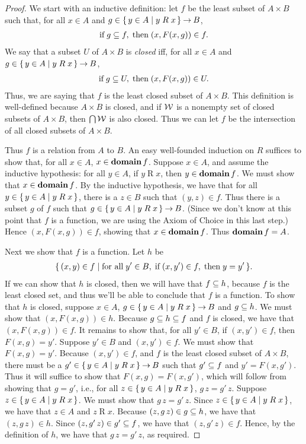 \begin{proof}
We start with an inductive definition:
let $f$ be the least subset of $A\times B$ such that, for
all $x\in A$ and $g\in\{ \, y\in A \mid y\mathrel{R}x \, \}\mathbin{\to} B$,
\begin{gather*}
\allowbreak\mbox{if}\allowbreak\; g\subseteq f, \;\allowbreak\mbox{then}\allowbreak\; (x, F(x, g))\in f .
\end{gather*}
We say that a subset $U$ of $A\times B$ is \emph{closed} iff, for
all $x\in A$ and $g\in\{ \, y\in A \mid y\mathrel{R}x \, \}\mathbin{\to} B$,
\begin{gather*}
\allowbreak\mbox{if}\allowbreak\; g\subseteq U, \;\allowbreak\mbox{then}\allowbreak\; (x, F(x, g))\in U .
\end{gather*}
Thus, we are saying that $f$ is the least closed subset of
$A\times B$.
This definition is well-defined because $A\times B$ is closed,
and if $\cal W$ is a nonempty set of closed subsets
of $A\times B$, then $\bigcap\cal W$ is also closed.
Thus we can let $f$ be the intersection of
all closed subsets of $A\times B$.

Thus $f$ is a relation from $A$ to $B$.  An easy well-founded
induction on $R$ suffices to show that, for all $x\in A$,
$x\in\mathbf{domain}\,f$.  Suppose $x\in A$, and assume the inductive
hypothesis: for all $y\in A$, if $y\mathrel{R}x$, then $y\in\mathbf{domain}\,f$.
We must show that $x\in\mathbf{domain}\,f$.  By the inductive hypothesis,
we have that for all $y\in\{ \, y\in A \mid y\mathrel{R}x \, \}$,
there is a $z\in B$ such that $(y,z)\in f$.  Thus there
is a subset $g$ of $f$ such that $g\in\{ \, y\in A \mid y\mathrel{R}x \, \}\mathbin{\to} B$.
(Since we don't know at this point that $f$ is a function, we
are using the Axiom of Choice in this last step.)
Hence $(x,F(x,g))\in f$, showing that $x\in\mathbf{domain}\,f$.
Thus $\mathbf{domain}\,f=A$.

Next we show that $f$ is a function.  Let $h$ be
\begin{gather*}
\{ \, (x,y)\in f \mid \allowbreak\mbox{for all}\allowbreak\;y'\in B,\;\allowbreak\mbox{if}\allowbreak\;(x,y')\in f,
\;\allowbreak\mbox{then}\allowbreak\; y = y' \, \} .
\end{gather*}
If we can show that $h$ is closed, then we will have that $f\subseteq h$,
because $f$ is the least closed set, and thus we'll be able to
conclude that $f$ is a function.  To show that $h$ is closed, suppose
$x\in A$, $g\in\{ \, y\in A \mid y\mathrel{R}x \, \}\mathbin{\to} B$ and $g\subseteq h$.  We
must show that $(x, F(x, g))\in h$. Because $g\subseteq h\subseteq f$ and $f$ is
closed, we have that $(x, F(x, g))\in f$.  It remains to show that,
for all $y'\in B$, if $(x,y')\in f$, then $F(x, g) = y'$.  Suppose
$y'\in B$ and $(x,y')\in f$.  We must show that $F(x, g) = y'$.
Because $(x,y')\in f$, and $f$ is the least closed subset of
$A\times B$, there must be a
$g'\in \{ \, y\in A \mid y\mathrel{R}x \, \}\mathbin{\to} B$ such that $g'\subseteq f$ and
$y'=F(x, g')$.  Thus it will suffice to show that $F(x,g) = F(x, g')$,
which will follow from showing that $g=g'$, i.e., for all
$z\in\{ \, y\in A \mid y\mathrel{R}x \, \}$, $g\,z=g'\,z$.  Suppose
$z\in\{ \, y\in A \mid y\mathrel{R}x \, \}$.  We must show that $g\,z=g'\,z$.
Since $z\in\{ \, y\in A \mid y\mathrel{R}x \, \}$, we have that $z\in A$ and
$z\mathrel{R}x$.  Because $(z,g\,z)\in g\subseteq h$, we have that
$(z,g\,z)\in h$.  Since $(z,g'\,z)\in g'\subseteq f$, we have that
$(z,g'\,z)\in f$.  Hence, by the definition of $h$, we have that
$g\,z=g'\,z$, as required.


\end{proof}

